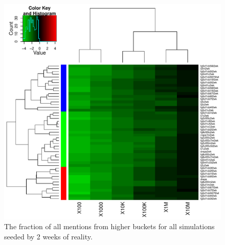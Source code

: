 \documentclass[10pt,oneside]{memoir}
\begin{document}
\begin{Spacing}{2}
\begin{figure}
\begin{center}
    \includegraphics{figures/crop/heatmap-b2bm-befr-rel-medians-log10-2wk}
    \caption{The fraction of all mentions from higher buckets for all simulations seeded by 2 weeks of reality.}
    \label{figure:heatmap-b2bm-befr-rel-medians-2wk}
\end{center}
\end{figure}


\end{Spacing}
\end{document}
